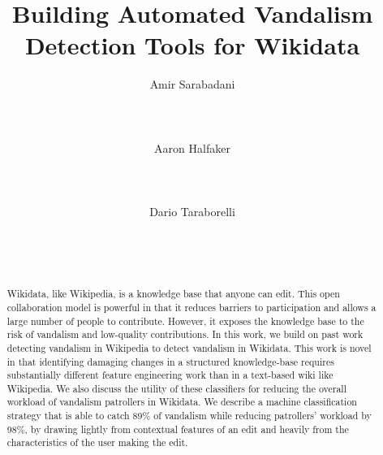 \documentclass{sig-alternate-2013}
\begin{document}
\title{Building Automated Vandalism Detection Tools for Wikidata}

\author{
\alignauthor Amir Sarabadani\\
\\
\\
\\
\alignauthor Aaron Halfaker\\
\\
\\
\\
\alignauthor Dario Taraborelli\\
\\
\\
\\
}

\maketitle
\begin{abstract}
Wikidata, like Wikipedia, is a knowledge base that anyone can edit.  This open collaboration model is powerful in that it reduces barriers to participation and allows a large number of people to contribute. However, it exposes the knowledge base to the risk of vandalism and low-quality contributions.  In this work, we build on past work detecting vandalism in Wikipedia to detect vandalism in Wikidata.  This work is novel in that identifying damaging changes in a structured knowledge-base requires substantially different feature engineering work than in a text-based wiki like Wikipedia.  We also discuss the utility of these classifiers for reducing the overall workload of vandalism patrollers in Wikidata.  We describe a machine classification strategy that is able to catch 89\% of vandalism while reducing patrollers' workload by 98\%, by drawing lightly from contextual features of an edit and heavily from the characteristics of the user making the edit.
\end{abstract}

\end{document}

